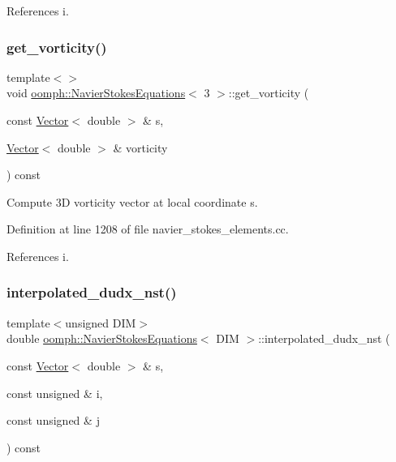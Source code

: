 References i.

\mbox{\label{classoomph_1_1NavierStokesEquations_adba47f99c44237f2687ae609496eaf60}} 
\subsubsection{\texorpdfstring{get\+\_\+vorticity()}{get\_vorticity()}\hspace{0.1cm}{\footnotesize\ttfamily [3/3]}}
{\footnotesize\ttfamily template$<$$>$ \\
void \hyperlink{classoomph_1_1NavierStokesEquations}{oomph\+::\+Navier\+Stokes\+Equations}$<$ 3 $>$\+::get\+\_\+vorticity (\begin{DoxyParamCaption}\item[{const \hyperlink{classoomph_1_1Vector}{Vector}$<$ double $>$ \&}]{s,  }\item[{\hyperlink{classoomph_1_1Vector}{Vector}$<$ double $>$ \&}]{vorticity }\end{DoxyParamCaption}) const}



Compute 3D vorticity vector at local coordinate s. 



Definition at line 1208 of file navier\+\_\+stokes\+\_\+elements.\+cc.



References i.

\mbox{\label{classoomph_1_1NavierStokesEquations_a3fa34303035c253c66c0f69752e5949e}} 
\subsubsection{\texorpdfstring{interpolated\+\_\+dudx\+\_\+nst()}{interpolated\_dudx\_nst()}}
{\footnotesize\ttfamily template$<$unsigned D\+IM$>$ \\
double \hyperlink{classoomph_1_1NavierStokesEquations}{oomph\+::\+Navier\+Stokes\+Equations}$<$ D\+IM $>$\+::interpolated\+\_\+dudx\+\_\+nst (\begin{DoxyParamCaption}\item[{const \hyperlink{classoomph_1_1Vector}{Vector}$<$ double $>$ \&}]{s,  }\item[{const unsigned \&}]{i,  }\item[{const unsigned \&}]{j }\end{DoxyParamCaption}) const\hspace{0.3cm}{\ttfamily [inline]}}



